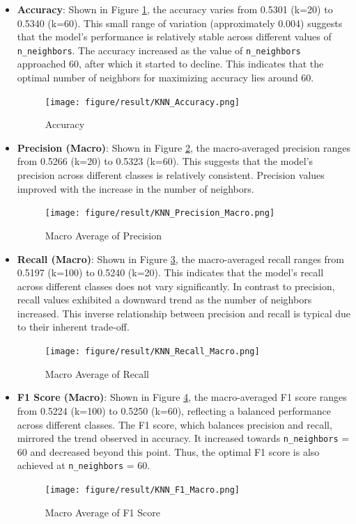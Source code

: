 \documentclass[times, twocolumn]{article}
\begin{document}
\begin{itemize}
    \item \textbf{Accuracy}: Shown in Figure \ref{fig:accuracy}, the accuracy varies from 0.5301 (k=20) to 0.5340 (k=60). This small range of variation (approximately 0.004) suggests that the model's performance is relatively stable across different values of \verb|n_neighbors|. The accuracy increased as the value of \verb|n_neighbors| approached 60, after which it started to decline. This indicates that the optimal number of neighbors for maximizing accuracy lies around 60.
    \begin{figure}[H]
        \centering
        \texttt{[image: figure/result/KNN\_Accuracy.png]}
        \caption{Accuracy}
        \label{fig:accuracy}
    \end{figure}
    
    \item \textbf{Precision (Macro)}: Shown in Figure \ref{fig:precision}, the macro-averaged precision ranges from 0.5266 (k=20) to 0.5323 (k=60). This suggests that the model's precision across different classes is relatively consistent. Precision values improved with the increase in the number of neighbors.
    \begin{figure}[H]
        \centering
        \texttt{[image: figure/result/KNN\_Precision\_Macro.png]}
        \caption{Macro Average of Precision}
        \label{fig:precision}
    \end{figure}

    \item \textbf{Recall (Macro)}: Shown in Figure \ref{fig:recall}, the macro-averaged recall ranges from 0.5197 (k=100) to 0.5240 (k=20). This indicates that the model's recall across different classes does not vary significantly. In contrast to precision, recall values exhibited a downward trend as the number of neighbors increased. This inverse relationship between precision and recall is typical due to their inherent trade-off.
    \begin{figure}[H]
        \centering
        \texttt{[image: figure/result/KNN\_Recall\_Macro.png]}
        \caption{Macro Average of Recall}
        \label{fig:recall}
    \end{figure}
    
    \item \textbf{F1 Score (Macro)}: Shown in Figure \ref{fig:f1}, the macro-averaged F1 score ranges from 0.5224 (k=100) to 0.5250 (k=60), reflecting a balanced performance across different classes. The F1 score, which balances precision and recall, mirrored the trend observed in accuracy. It increased towards \verb|n_neighbors| = 60 and decreased beyond this point. Thus, the optimal F1 score is also achieved at \verb|n_neighbors| = 60.
    \begin{figure}[H]
        \centering
        \texttt{[image: figure/result/KNN\_F1\_Macro.png]}
        \caption{Macro Average of F1 Score}
        \label{fig:f1}
    \end{figure}
\end{itemize}
\end{document}
